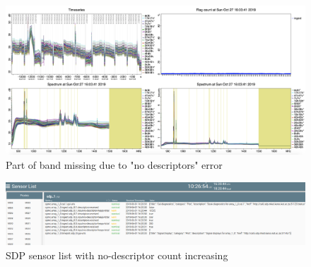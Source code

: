 \begin{figure}[H]
	\centering
	\includegraphics[scale=0.18]{Chapters/images/image65.png}
	
	\caption{Part of band missing due to "no descriptors" error}
	\label{fig:image65}
\end{figure}

\begin{figure}[!thb]
	\centering
	\includegraphics[scale=0.25]{Chapters/images/image37.png}
	
	\caption{SDP sensor list with no-descriptor count increasing}
	\label{fig:image37}
\end{figure}



